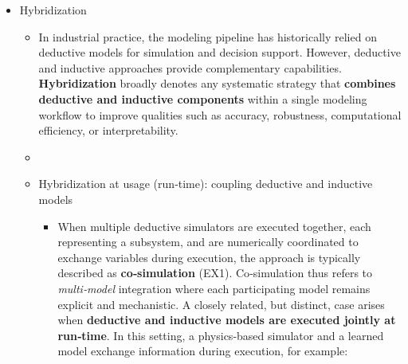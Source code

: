 \documentclass[
]{article}
\providecommand{\tightlist}{%
  \setlength{\itemsep}{0pt}\setlength{\parskip}{0pt}}
\begin{document}
\begin{itemize}
\begin{itemize}
\begin{itemize}
      Inductive models can approximate complex nonlinear behaviors
      efficiently, but their reliability depends strongly on data
      coverage, noise characteristics, and distribution shifts.
    \end{itemize}
  \item
    Hybridization

    \begin{itemize}
    \item
      In industrial practice, the modeling pipeline has historically
      relied on deductive models for simulation and decision support.
      However, deductive and inductive approaches provide complementary
      capabilities. \textbf{Hybridization} broadly denotes any
      systematic strategy that \textbf{combines deductive and inductive
      components} within a single modeling workflow to improve qualities
      such as accuracy, robustness, computational efficiency, or
      interpretability.
    \item
    \item
      Hybridization at usage (run‑time): coupling deductive and
      inductive models

      \begin{itemize}
      \tightlist
      \item
        When multiple deductive simulators are executed together, each
        representing a subsystem, and are numerically coordinated to
        exchange variables during execution, the approach is typically
        described as \textbf{co‑simulation} (EX1). Co‑simulation thus
        refers to \emph{multi‑model} integration where each
        participating model remains explicit and mechanistic. A closely
        related, but distinct, case arises when \textbf{deductive and
        inductive models are executed jointly at run‑time}. In this
        setting, a physics‑based simulator and a learned model exchange
        information during execution, for example:


\end{itemize}
\end{itemize}
\end{itemize}
\end{itemize}
\end{document}
